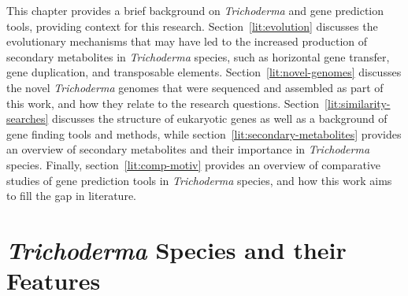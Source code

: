 
This chapter provides a brief background on \textit{Trichoderma} and gene prediction tools, providing context for this research. Section~\ref{lit:evolution} discusses the evolutionary mechanisms that may have led to the increased production of secondary metabolites in \textit{Trichoderma} species, such as horizontal gene transfer, gene duplication, and transposable elements. Section~\ref{lit:novel-genomes} discusses the novel \textit{Trichoderma} genomes that were sequenced and assembled as part of this work, and how they relate to the research questions. Section~\ref{lit:similarity-searches} discusses the structure of eukaryotic genes as well as a background of gene finding tools and methods, while section~\ref{lit:secondary-metabolites} provides an overview of secondary metabolites and their importance in \textit{Trichoderma} species. Finally, section~\ref{lit:comp-motiv} provides an overview of comparative studies of gene prediction tools in \textit{Trichoderma} species, and how this work aims to fill the gap in literature.

\section{\textit{Trichoderma} Species and their Features}
\label{lit:features}

